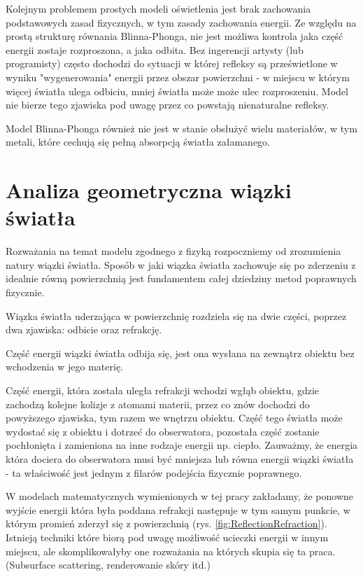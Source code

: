 \documentclass[../main.tex]{subfiles}
\begin{document}
Kolejnym problemem prostych modeli oświetlenia jest brak zachowania
podstawowych zasad fizycznych, w tym zasady zachowania energii. Ze względu na
prostą strukturę równania Blinna-Phonga, nie jest możliwa kontrola jaka część
energii zostaje rozproszona, a jaka odbita. Bez ingerencji artysty (lub
programisty) często dochodzi do sytuacji w której refleksy są prześwietlone w
wyniku "wygenerowania" energii przez obszar powierzchni - w miejscu w którym
więcej światła ulega odbiciu, mniej światła może może ulec rozproszeniu. Model
nie bierze tego zjawiska pod uwagę przez co powstają nienaturalne refleksy.

Model Blinna-Phonga również nie jest w stanie obsłużyć wielu materiałów,
w tym metali, które cechują się pełną absorpcją światła załamanego.

\section{Analiza geometryczna wiązki światła}

Rozważania na temat modelu zgodnego z fizyką rozpoczniemy od zrozumienia natury
wiązki światła. Sposób w jaki wiązka światła zachowuje się po zderzeniu z
idealnie równą powierzchnią jest fundamentem całej dziedziny metod poprawnych
fizycznie.

Wiązka światła uderzająca w powierzchnię rozdziela się na dwie części, poprzez
dwa zjawiska: odbicie oraz refrakcję.

Część energii wiązki światła odbija się, jest ona wysłana na zewnątrz obiektu
bez wchodzenia w jego materię.

Część energii, która została uległa refrakcji wchodzi wgłąb obiektu, gdzie
zachodzą kolejne kolizje z atomami materii, przez co znów dochodzi do
powyższego zjawiska, tym razem we wnętrzu obiektu. Część tego światła może
wydostać się z obiektu i dotrzeć do obserwatora, pozostała część zostanie
pochłonięta i zamieniona na inne rodzaje energii np. ciepło. Zauważmy, że
energia która dociera do obserwatora musi być mniejsza lub równa energii wiązki
światła - ta właściwość jest jednym z filarów podejścia fizycznie poprawnego.

W modelach matematycznych wymienionych w tej pracy zakładamy, że ponowne
wyjście energii która była poddana refrakcji następuje w tym samym punkcie, w
którym promień zderzył się z powierzchnią (rys.
\ref{fig:ReflectionRefraction}). Istnieją techniki które biorą pod uwagę
możliwość ucieczki energii w innym miejscu, ale skomplikowałyby one rozważania
na których skupia się ta praca.  (Subsurface scattering, renderowanie skóry
itd.)
\end{document}
